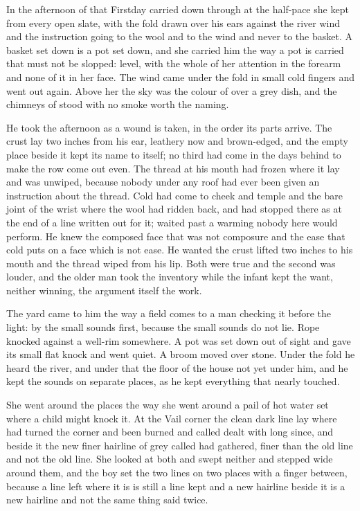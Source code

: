 In the afternoon of that Firstday  carried  down through  at the half-pace she kept from every open slate, with the fold drawn over his ears against the river wind and the instruction going to the wool and to the wind and never to the basket. A basket set down is a pot set down, and she carried him the way a pot is carried that must not be slopped: level, with the whole of her attention in the forearm and none of it in her face. The wind came under the fold in small cold fingers and went out again. Above her the sky was the colour of  over a grey dish, and the chimneys of  stood with no smoke worth the naming.

He took the afternoon as a wound is taken, in the order its parts arrive. The crust lay two inches from his ear, leathery now and brown-edged, and the empty place beside it kept its name to itself; no third had come in the days behind to make the row come out even. The thread at his mouth had frozen where it lay and was unwiped, because nobody under any roof had ever been given an instruction about the thread. Cold had come to cheek and temple and the bare joint of the wrist where the wool had ridden back, and had stopped there as at the end of a line written out for it;  waited past a warming nobody here would perform. He knew the composed face that was not composure and the ease that cold puts on a face which is not ease. He wanted the crust lifted two inches to his mouth and the thread wiped from his lip. Both were true and the second was louder, and the older man took the inventory while the infant kept the want, neither winning, the argument itself the work.

The yard came to him the way a field comes to a man checking it before the light: by the small sounds first, because the small sounds do not lie. Rope knocked against a well-rim somewhere. A pot was set down out of sight and gave its small flat knock and went quiet. A broom moved over stone. Under the fold he heard the river, and under that the floor of the house not yet under him, and he kept the sounds on separate places, as he kept everything that nearly touched.

She went around the places the way she went around a pail of hot water set where a child might knock it. At the Vail corner the clean dark line lay where  had turned the corner and been burned and called dealt with long since, and beside it the new finer hairline of grey called  had gathered, finer than the old line and not the old line. She looked at both and swept neither and stepped wide around them, and the boy set the two lines on two places with a finger between, because a line left where it is is still a line kept and a new hairline beside it is a new hairline and not the same thing said twice.

